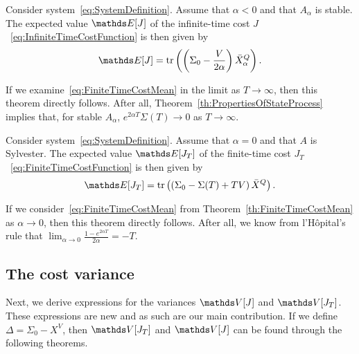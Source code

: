 \documentclass[twocolumn]{autart}
\begin{document}
\begin{thm}\label{th:InfiniteTimeCostMean}
Consider system~\eqref{eq:SystemDefinition}. Assume that $\alpha < 0$ and that $A_\alpha$ is stable. The expected value $\ex[J]$ of the infinite-time cost $J$~\eqref{eq:InfiniteTimeCostFunction} is then given by
\begin{equation}
\ex[J] = \tr\left(\left(\Sigma_0 - \frac{V}{2\alpha}\right) \bar{X}_\alpha^Q\right). \label{eq:InfiniteTimeCostMean}
\end{equation}
\end{thm}
\begin{pf}
If we examine~\eqref{eq:FiniteTimeCostMean} in the limit as $T \rightarrow \infty$, then this theorem directly follows. After all, Theorem~\ref{th:PropertiesOfStateProcess} implies that, for stable $A_\alpha$, $e^{2\alpha T} \Sigma(T) \rightarrow 0$ as $T \rightarrow \infty$.
\end{pf}

\begin{thm}\label{th:FiniteTimeCostMeanWithAlphaZero}
Consider system~\eqref{eq:SystemDefinition}. Assume that $\alpha = 0$ and that $A$ is Sylvester. The expected value $\ex[J_T]$ of the finite-time cost $J_T$~\eqref{eq:FiniteTimeCostFunction} is then given by
\begin{equation}
\ex[J_T] = \tr\left(\left(\Sigma_0 - \Sigma(T) + TV\right) \bar{X}^Q\right). \label{eq:FiniteTimeCostMeanWithAlphaZero}
\end{equation}
\end{thm}
\begin{pf}
If we consider~\eqref{eq:FiniteTimeCostMean} from Theorem~\ref{th:FiniteTimeCostMean} as $\alpha \rightarrow 0$, then this theorem directly follows. After all, we know from l'H\^opital's rule that $\lim_{\alpha \rightarrow 0} \frac{1 - e^{2\alpha T}}{2\alpha} = -T$.
\end{pf}

\subsection{The cost variance}

Next, we derive expressions for the variances $\va[J]$ and $\va[J_T]$. These expressions are new and as such are our main contribution. If we define $\Delta = \Sigma_0 - X^V$, then $\va[J_T]$ and $\va[J]$ can be found through the following theorems.
\end{document}
